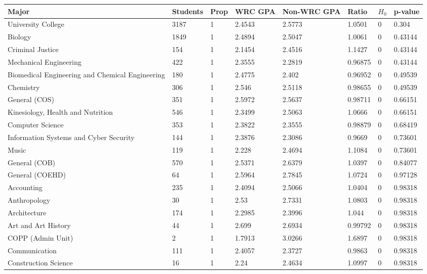 \begin{sidewaystable}
{\scriptsize \ttfamily \begin{longtable}{llllllll}\label{table:WRC}
 \centering 
 \textbf{Major} & \textbf{Students} & \textbf{Prop} & \textbf{WRC GPA} & \textbf{Non-WRC GPA} & \textbf{Ratio} & \textbf{$H_0$} & \textbf{p-value} \\ 
\hline 
University College & 3187 & 1 & 2.4543 & 2.5773 & 1.0501 & 0 & 0.304 \\ 
Biology & 1849 & 1 & 2.4894 & 2.5047 & 1.0061 & 0 & 0.43144 \\ 
Criminal Justice & 154 & 1 & 2.1454 & 2.4516 & 1.1427 & 0 & 0.43144 \\ 
Mechanical Engineering & 422 & 1 & 2.3555 & 2.2819 & 0.96875 & 0 & 0.43144 \\ 
Biomedical Engineering and Chemical Engineering & 180 & 1 & 2.4775 & 2.402 & 0.96952 & 0 & 0.49539 \\ 
Chemistry & 306 & 1 & 2.546 & 2.5118 & 0.98655 & 0 & 0.49539 \\ 
General (COS) & 351 & 1 & 2.5972 & 2.5637 & 0.98711 & 0 & 0.66151 \\ 
Kinesiology, Health and Nutrition & 546 & 1 & 2.3499 & 2.5063 & 1.0666 & 0 & 0.66151 \\ 
Computer Science & 353 & 1 & 2.3822 & 2.3555 & 0.98879 & 0 & 0.68419 \\ 
Information Systems and Cyber Security & 144 & 1 & 2.3876 & 2.3086 & 0.9669 & 0 & 0.73601 \\ 
Music & 119 & 1 & 2.228 & 2.4694 & 1.1084 & 0 & 0.73601 \\ 
General (COB) & 570 & 1 & 2.5371 & 2.6379 & 1.0397 & 0 & 0.84077 \\ 
General (COEHD) & 64 & 1 & 2.5964 & 2.7845 & 1.0724 & 0 & 0.97128 \\ 
Accounting & 235 & 1 & 2.4094 & 2.5066 & 1.0404 & 0 & 0.98318 \\ 
Anthropology & 30 & 1 & 2.53 & 2.7331 & 1.0803 & 0 & 0.98318 \\ 
Architecture & 174 & 1 & 2.2985 & 2.3996 & 1.044 & 0 & 0.98318 \\ 
Art and Art History & 44 & 1 & 2.699 & 2.6934 & 0.99792 & 0 & 0.98318 \\ 
COPP  (Admin Unit) & 2 & 1 & 1.7913 & 3.0266 & 1.6897 & 0 & 0.98318 \\ 
Communication & 111 & 1 & 2.4057 & 2.3727 & 0.9863 & 0 & 0.98318 \\ 
Construction Science & 16 & 1 & 2.24 & 2.4634 & 1.0997 & 0 & 0.98318 \\ 

\end{longtable}}
\end{sidewaystable}
